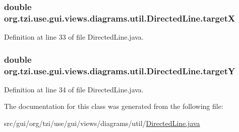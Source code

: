 \hypertarget{classorg_1_1tzi_1_1use_1_1gui_1_1views_1_1diagrams_1_1util_1_1_directed_line_a656fcd747f02710cb526bb49f9ba3a19}{
\subsubsection[{target\-X}]{\setlength{\rightskip}{0pt plus 5cm}double org.\-tzi.\-use.\-gui.\-views.\-diagrams.\-util.\-Directed\-Line.\-target\-X\hspace{0.3cm}{\ttfamily [protected]}}}\label{classorg_1_1tzi_1_1use_1_1gui_1_1views_1_1diagrams_1_1util_1_1_directed_line_a656fcd747f02710cb526bb49f9ba3a19}


Definition at line 33 of file Directed\-Line.\-java.

\hypertarget{classorg_1_1tzi_1_1use_1_1gui_1_1views_1_1diagrams_1_1util_1_1_directed_line_ac5e07022c9699c06c30232bd14d09caf}{
\subsubsection[{target\-Y}]{\setlength{\rightskip}{0pt plus 5cm}double org.\-tzi.\-use.\-gui.\-views.\-diagrams.\-util.\-Directed\-Line.\-target\-Y\hspace{0.3cm}{\ttfamily [protected]}}}\label{classorg_1_1tzi_1_1use_1_1gui_1_1views_1_1diagrams_1_1util_1_1_directed_line_ac5e07022c9699c06c30232bd14d09caf}


Definition at line 34 of file Directed\-Line.\-java.



The documentation for this class was generated from the following file\-:\begin{DoxyCompactItemize}
\item 
src/gui/org/tzi/use/gui/views/diagrams/util/\hyperlink{_directed_line_8java}{Directed\-Line.\-java}\end{DoxyCompactItemize}
